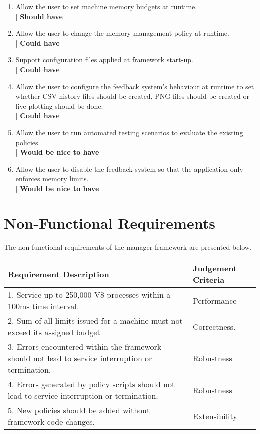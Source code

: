\documentclass{l4proj}
\begin{document}
\begin{enumerate}
\item Allow the user to set machine memory budgets at runtime.\\| \textbf{Should have}

\item Allow the user to change the memory management policy at runtime.\\| \textbf{Could have}

\item Support configuration files applied at framework start-up.\\| \textbf{Could have}

\item Allow the user to configure the feedback system's behaviour at runtime to set whether CSV history files should be created, PNG files should be created or live plotting should be done.\\| \textbf{Could have}

\item Allow the user to run automated testing scenarios to evaluate the existing policies.\\| \textbf{Would be nice to have}

\item Allow the user to disable the feedback system so that the application only enforces memory limits. \\| \textbf{Would be nice to have}
\end{enumerate}

\section{Non-Functional Requirements}
\hspace*{1em} The non-functional requirements of the manager framework are presented below.
\begin{center}
\begin{tabular}{  | l | l | }
\hline  
  Requirement Description & Judgement Criteria \\
\hline
 1. Service up to 250,000 V8 processes within a 100ms time interval. & Performance\\
 2. Sum of all limits issued for a machine must not exceed its assigned budget & Correctness. \\
 3. Errors encountered within the framework should not lead to service interruption or termination. & Robustness \\
 4. Errors generated by policy scripts should not lead to service interruption or termination. & Robustness \\
 5. New policies should be added without framework code changes. & Extensibility \\
\hline
\end{tabular}
\end{center}
\end{document}
